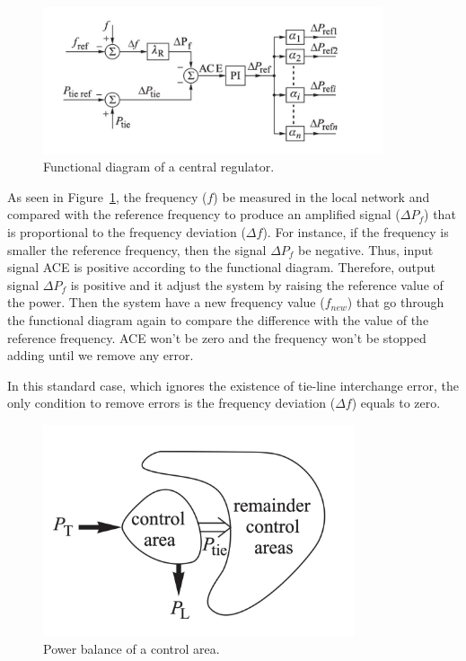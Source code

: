 \begin{figure}[htb]
\centering
\includegraphics[width = 0.891\textwidth]{figure/3_1_Functional.png}
\caption{Functional diagram of a central regulator.}
\label{3_1_Functional}
\end{figure}

As seen in Figure~\ref{3_1_Functional}, the frequency ($f$) be measured in the local network and compared with the reference frequency to produce an amplified signal ($\Delta P_f$) that is proportional to the frequency deviation ($\Delta f$). For instance, if the frequency is smaller the reference frequency, then the signal $\Delta P_f$ be negative. Thus, input signal ACE is positive according to the functional diagram. Therefore, output signal $\Delta P_f$ is positive and it adjust the system by raising the reference value of the power. Then the system have a new frequency value ($f_{n e w}$) that go through the functional diagram again to compare the difference with the value of the reference frequency. ACE won’t be zero and the frequency won’t be stopped adding until we remove any error. 

In this standard case, which ignores the existence of tie-line interchange error, the only condition to remove errors is the frequency deviation ($\Delta f$) equals to zero. 

\begin{figure}[htbp]
\centering
\includegraphics[width =0.819\textwidth]{figure/3_1_Power.png}
\caption{Power balance of a control area.}
\label{3_1_Power}
\end{figure}

